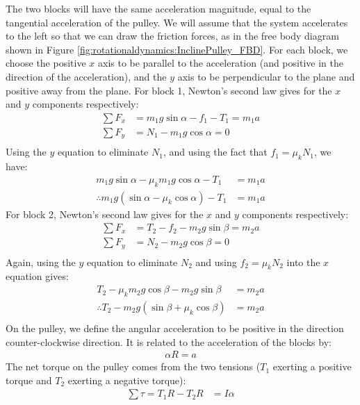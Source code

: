 \begin{solution}
The two blocks will have the same acceleration magnitude, equal to the tangential acceleration of the pulley. We will assume that the system accelerates to the left so that we can draw the friction forces, as in the free body diagram shown in Figure \ref{fig:rotationaldynamics:InclinePulley_FBD}.
For each block, we choose the positive $x$ axis to be parallel to the acceleration (and positive in the direction of the acceleration), and the $y$ axis to be perpendicular to the plane and positive away from the plane. For block 1, Newton's second law gives for the $x$ and $y$ components respectively:
\begin{align*}
\sum F_x&=m_1g\sin\alpha-f_1-T_1=m_1a\\
\sum F_y&=N_1-m_1g\cos\alpha=0\\
\end{align*}
Using the $y$ equation to eliminate $N_1$, and using the fact that $f_1=\mu_kN_1$, we have:
\begin{align*}
m_1g\sin\alpha-\mu_km_1g\cos\alpha-T_1&=m_1a\\
\therefore m_1g(\sin\alpha-\mu_k\cos\alpha)-T_1&=m_1a
\end{align*}
For block 2, Newton's second law gives for the $x$ and $y$ components respectively:
\begin{align*}
\sum F_x&=T_2-f_2-m_2g\sin\beta=m_2a\\
\sum F_y&=N_2-m_2g\cos\beta=0\\
\end{align*}
Again, using the $y$ equation to eliminate $N_2$ and using $f_2=\mu_kN_2$ into the $x$ equation gives:
\begin{align*}
T_2-\mu_km_2g\cos\beta-m_2g\sin\beta&=m_2a\\
\therefore T_2-m_2g(\sin\beta+\mu_k\cos\beta)&=m_2a\\
\end{align*}
On the pulley, we define the angular acceleration to be positive in the direction counter-clockwise direction. It is related to the acceleration of the blocks by:
\begin{align*}
\alpha R = a
\end{align*}
The net torque on the pulley comes from the two tensions ($T_1$ exerting a positive torque and $T_2$ exerting a negative torque):
\begin{align*}
\sum \tau = T_1R-T_2R&=I\alpha\\

\end{align*}
\end{solution}
